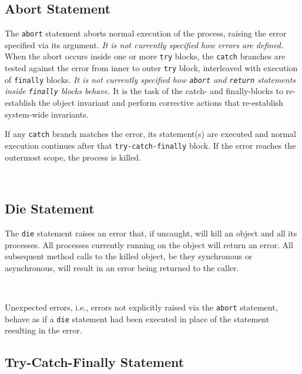\subsection{Abort Statement}
\label{sec:abort-statement}

The \texttt{abort} statement aborts normal execution of the process,
raising the error specified via its argument.  \emph{It is not currently
  specified how errors are defined.}  When the abort occurs inside one
or more \texttt{try} blocks, the \texttt{catch} branches are tested
against the error from inner to outer \texttt{try} block, interleaved
with execution of \texttt{finally} blocks.  \emph{It is not currently
  specified how \texttt{abort} and \texttt{return} statements inside
  \texttt{finally} blocks behave.}  It is the task of the catch- and
finally-blocks to re-establish the object invariant and perform
corrective actions that re-establish system-wide invariants.

If any \texttt{catch} branch matches the error, its statement(s) are
executed and normal execution continues after that
\texttt{try-catch-finally} block.  If the error reaches the outermost
scope, the process is killed.

\begin{abssyntax}
  {}\ \ \TRS{;}
\end{abssyntax}


\subsection{Die Statement}
\label{sec:die-statement}

The \texttt{die} statement raises an error that, if uncaught, will kill
an object and all its processes.  All processes currently running on the
object will return an error.  All subsequent method calls to the killed
object, be they synchronous or asynchronous, will result in an error
being returned to the caller.

\begin{abssyntax}
  {}\ \ \TRS{;}
\end{abssyntax}

Unexpected errors, i.e., errors not explicitly raised via the
\texttt{abort} statement, behave as if a \texttt{die} statement had been
executed in place of the statement resulting in the error.

\subsection{Try-Catch-Finally Statement}
\label{sec:try-catch-finally}

